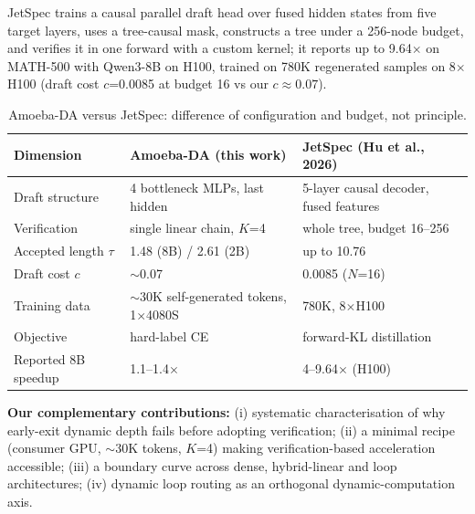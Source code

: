 \documentclass[11pt,a4paper]{article}
\begin{document}
JetSpec trains a causal parallel draft head over fused hidden states from five target layers,
uses a tree-causal mask, constructs a tree under a 256-node budget, and verifies it in one
forward with a custom kernel; it reports up to 9.64$\times$ on MATH-500 with Qwen3-8B on H100,
trained on 780K regenerated samples on 8$\times$H100 (draft cost $c$=0.0085 at budget 16 vs our
$c\approx0.07$).
\begin{table}[h]
\centering
\small
\begin{tabular}{lll}
\toprule
Dimension & Amoeba-DA (this work) & JetSpec (Hu et al., 2026)\\
\midrule
Draft structure & 4 bottleneck MLPs, last hidden & 5-layer causal decoder, fused features\\
Verification & single linear chain, $K$=4 & whole tree, budget 16--256\\
Accepted length $\tau$ & 1.48 (8B) / 2.61 (2B) & up to 10.76\\
Draft cost $c$ & $\sim$0.07 & 0.0085 ($N$=16)\\
Training data & $\sim$30K self-generated tokens, 1$\times$4080S & 780K, 8$\times$H100\\
Objective & hard-label CE & forward-KL distillation\\
Reported 8B speedup & 1.1--1.4$\times$ & 4--9.64$\times$ (H100)\\
\bottomrule
\end{tabular}
\caption{Amoeba-DA versus JetSpec: difference of configuration and budget, not principle.}
\end{table}
\noindent\textbf{Our complementary contributions:} (i) systematic characterisation of why
early-exit dynamic depth fails before adopting verification; (ii) a minimal recipe
(consumer GPU, $\sim$30K tokens, $K$=4) making verification-based acceleration accessible;
(iii) a boundary curve across dense, hybrid-linear and loop architectures; (iv) dynamic loop
routing as an orthogonal dynamic-computation axis.
\end{document}
